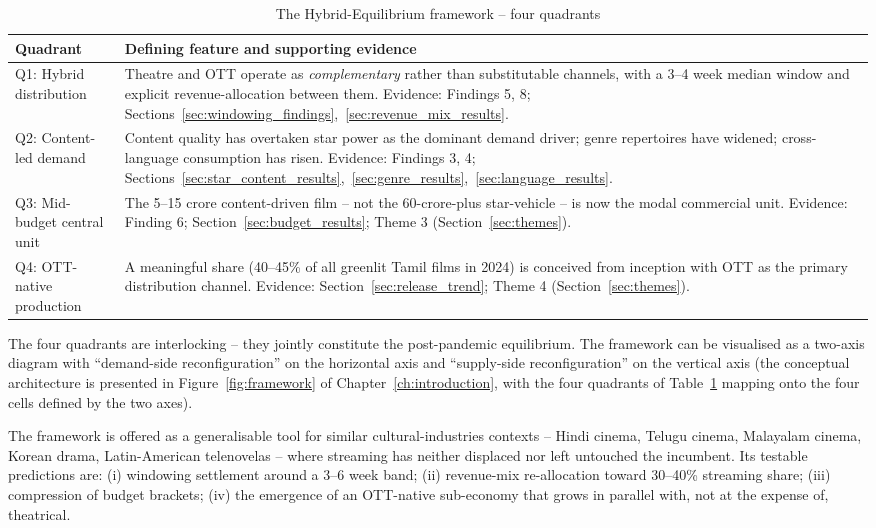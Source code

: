 \begin{table}[h]
\centering
\caption{The Hybrid-Equilibrium framework -- four quadrants}
\label{tab:hybrid_quadrants}
\small
\begin{tabular}{p{4.0cm} p{11.0cm}}
\toprule
\textbf{Quadrant} & \textbf{Defining feature and supporting evidence} \\
\midrule
Q1: Hybrid distribution
& Theatre and OTT operate as \emph{complementary} rather than
substitutable channels, with a 3--4 week median window and
explicit revenue-allocation between them.  Evidence:
Findings 5, 8; Sections~\ref{sec:windowing_findings},~\ref{sec:revenue_mix_results}. \\
Q2: Content-led demand
& Content quality has overtaken star power as the dominant
demand driver; genre repertoires have widened; cross-language
consumption has risen.  Evidence: Findings 3, 4;
Sections~\ref{sec:star_content_results},~\ref{sec:genre_results},~\ref{sec:language_results}. \\
Q3: Mid-budget central unit
& The 5--15 crore content-driven film -- not the 60-crore-plus
star-vehicle -- is now the modal commercial unit.
Evidence: Finding 6; Section~\ref{sec:budget_results}; Theme 3 (Section~\ref{sec:themes}). \\
Q4: OTT-native production
& A meaningful share (40--45\% of all greenlit Tamil films in 2024)
is conceived from inception with OTT as the primary
distribution channel.  Evidence: Section~\ref{sec:release_trend};
Theme 4 (Section~\ref{sec:themes}). \\
\bottomrule
\end{tabular}
\end{table}

The four quadrants are interlocking -- they jointly constitute the
post-pandemic equilibrium.  The framework can be visualised as a
two-axis diagram with ``demand-side reconfiguration'' on the
horizontal axis and ``supply-side reconfiguration'' on the vertical
axis (the conceptual architecture is presented in
Figure~\ref{fig:framework} of Chapter~\ref{ch:introduction}, with
the four quadrants of Table~\ref{tab:hybrid_quadrants} mapping onto
the four cells defined by the two axes).

The framework is offered as a generalisable tool for similar
cultural-industries contexts -- Hindi cinema, Telugu cinema,
Malayalam cinema, Korean drama, Latin-American telenovelas -- where
streaming has neither displaced nor left untouched the incumbent.
Its testable predictions are: (i) windowing settlement around a
3--6 week band; (ii) revenue-mix re-allocation toward 30--40\%
streaming share; (iii) compression of budget brackets; (iv) the
emergence of an OTT-native sub-economy that grows in parallel with,
not at the expense of, theatrical.

